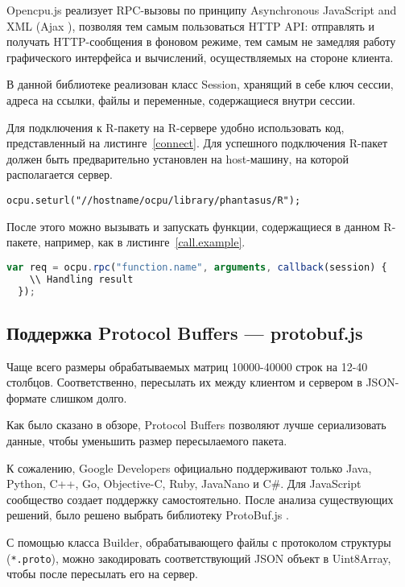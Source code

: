 \documentclass[specification,annotation]{itmo-student-thesis}
\begin{document}
Opencpu.js реализует RPC-вызовы по принципу Asynchronous JavaScript and XML (Ajax  \cite{ajax}), позволяя тем самым пользоваться HTTP API: отправлять и получать HTTP-сообщения в фоновом режиме, тем самым не замедляя работу графического интерфейса и вычислений, осуществляемых на стороне клиента.

В данной библиотеке реализован класс Session, хранящий в себе ключ сессии, адреса на ссылки, файлы и переменные, содержащиеся внутри сессии.

Для подключения к R-пакету на R-сервере удобно использовать код, представленный на листинге~\ref{connect}. Для успешного подключения R-пакет должен быть предварительно установлен на host-машину, на которой располагается сервер. 

\begin{lstlisting}[float=!h,caption={Подключение к R-пакету},label={connect}]
  ocpu.seturl("//hostname/ocpu/library/phantasus/R");
\end{lstlisting}

После этого можно вызывать и запускать функции, содержащиеся в данном R-пакете, например, как в листинге~\ref{call.example}.

\begin{lstlisting}[float=!h,caption={Пример вызова R-функции из JavaScript},label={call.example},language=JavaScript]
  var req = ocpu.rpc("function.name", arguments, callback(session) {
    \\ Handling result
  });
\end{lstlisting}

\subsection{Поддержка Protocol Buffers --- protobuf.js}
Чаще всего размеры обрабатываемых матриц 10000-40000 строк на 12-40 столбцов. Соответственно, пересылать их между клиентом и сервером в JSON-формате слишком долго.

Как было сказано в обзоре, Protocol Buffers позволяют лучше сериализовать данные, чтобы уменьшить размер пересылаемого пакета.

К сожалению, Google Developers официально поддерживают только Java, Python, C++, Go, Objective-C, Ruby, JavaNano и C\#. Для JavaScript сообщество создает поддержку самостоятельно. После анализа существующих решений, было решено выбрать библиотеку ProtoBuf.js \cite{protobufjs}.

С помощью класса Builder, обрабатывающего файлы с протоколом структуры (\texttt{*.proto}), можно закодировать соответствующий JSON объект в Uint8Array, чтобы после пересылать его на сервер.
\end{document}
